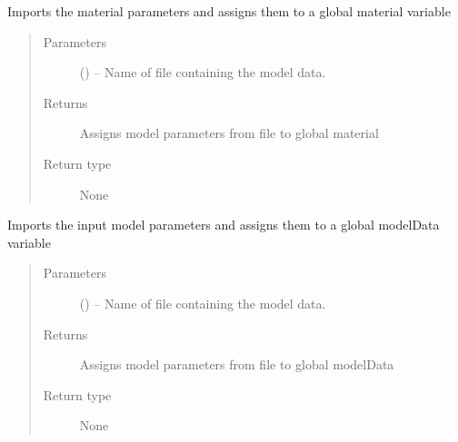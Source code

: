 \documentclass[letterpaper,10pt,english]{sphinxmanual}
\begin{document}

\begin{fulllineitems}
\label{\detokenize{MouseReferenceManual:Modules.Module_OSTRICH.importMaterialData}}
Imports the material parameters and assigns them to a global material variable
\begin{quote}\begin{description}
\item[{Parameters}] \leavevmode
{} () -- Name of file containing the model data.

\item[{Returns}] \leavevmode
Assigns model parameters from file to global material

\item[{Return type}] \leavevmode
None

\end{description}\end{quote}

\end{fulllineitems}


\begin{fulllineitems}
\label{\detokenize{MouseReferenceManual:Modules.Module_OSTRICH.importModelData}}
Imports the input model parameters and assigns them to a global modelData variable
\begin{quote}\begin{description}
\item[{Parameters}] \leavevmode
{} () -- Name of file containing the model data.

\item[{Returns}] \leavevmode
Assigns model parameters from file to global modelData

\item[{Return type}] \leavevmode
None

\end{description}\end{quote}

\end{fulllineitems}
\end{document}
